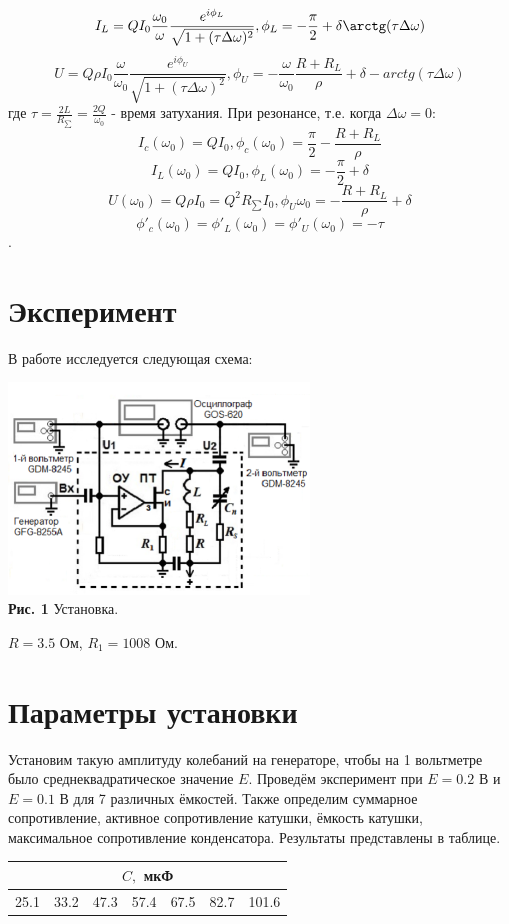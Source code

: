 \documentclass[a4paper, 12pt]{article}%
\begin{document}
$$I_L=QI_0\frac{\omega_0}{\omega}\frac{e^{i\phi_L}}{\sqrt{1+(\tau\Delta\omega)^2}}, \phi_L=-\frac{\pi}{2}+\delta\arctg(\tau\Delta\omega)$$
$$U=Q\rho I_0\frac{\omega}{\omega_0}\frac{e^{i\phi_U}}{\sqrt{1+(\tau\Delta\omega)^2}}, \phi_U=-\frac{\omega}{\omega_0}\frac{R+R_L}{\rho}+\delta-arctg(\tau\Delta\omega)$$
где $\tau=\frac{2L}{R_{\sum}}=\frac{2Q}{\omega_0}$ - время затухания.\newline
При резонансе, т.е. когда $\Delta\omega=0$:
$$I_c(\omega_0)=QI_0, \phi_c(\omega_0)=\frac{\pi}{2}-\frac{R+R_L}{\rho}$$
$$I_L(\omega_0)=QI_0, \phi_L(\omega_0)=-\frac{\pi}{2}+\delta$$
$$U(\omega_0)=Q\rho I_0=Q^2R_{\sum}I_0, \phi_U{\omega_0}=-\frac{R+R_L}{\rho}+\delta$$
$$\phi'_c(\omega_0)=\phi'_L(\omega_0)=\phi'_U(\omega_0)=-\tau$$.

\section*{Эксперимент}

В работе исследуется следующая схема:
\begin{center}
\includegraphics[width=0.6\textwidth]{U.png}\\
\textbf{Рис. 1} Установка.
\end{center}

$R=3.5$ Ом,
$R_1 = 1008$ Ом.
\section*{Параметры установки}
Установим такую амплитуду колебаний на генераторе, чтобы на 1 вольтметре было среднеквадратическое значение $E$. Проведём эксперимент при $E=0.2$ В и $E=0.1$ В для 7 различных ёмкостей. Также определим суммарное сопротивление, активное сопротивление катушки, ёмкость катушки, максимальное сопротивление конденсатора. Результаты представлены в таблице. 
\begin{table}[!ht]
\center
\begin{tabular}{|c|c|c|c|c|c|c|}
\hline
\multicolumn{7}{|c|}{$C,$ мкФ}                  \\ \hline
25.1 & 33.2 & 47.3 & 57.4 & 67.5 & 82.7 & 101.6 \\ \hline
\end{tabular}
\end{table}
\end{document}
